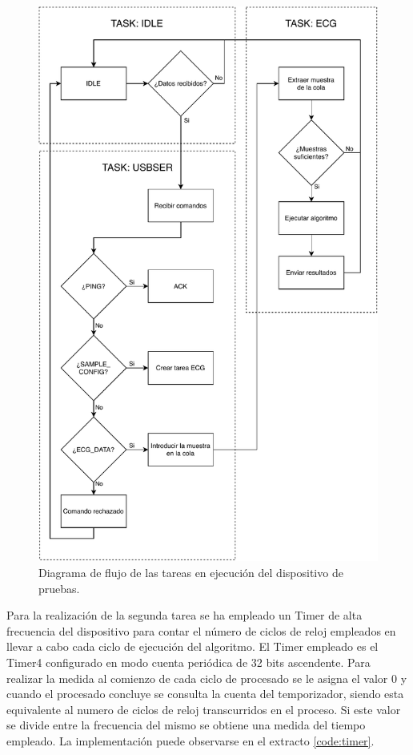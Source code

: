         \begin{figure}
                \centering
                        \includegraphics[width = 0.78 \linewidth]{figuras/TivaWorkFlow.pdf}
                \caption{Diagrama de flujo de las tareas en ejecución del dispositivo de pruebas.}
                \label{fig:tivaFlow}
        \end{figure}
        
        Para la realización de la segunda tarea se ha empleado un Timer de alta frecuencia del dispositivo para contar el número de ciclos de reloj empleados en llevar a cabo cada ciclo de ejecución del algoritmo. El Timer empleado es el Timer4 configurado en modo cuenta periódica de 32 bits ascendente. Para realizar la medida al comienzo de cada ciclo de procesado se le asigna el valor 0 y cuando el procesado concluye se consulta la cuenta del temporizador, siendo esta equivalente al numero de ciclos de reloj transcurridos en el proceso. Si este valor se divide entre la frecuencia del mismo se obtiene una medida del tiempo empleado. La implementación puede observarse en el extracto \ref{code:timer}.
        

